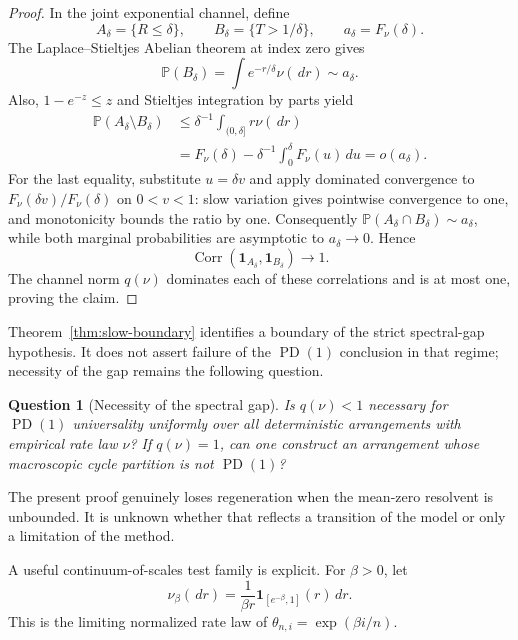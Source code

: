 \documentclass[11pt]{article}
\newtheorem{question}[theorem]{Question}
\theoremstyle{definition}
\theoremstyle{remark}
\newcommand{\Pp}{\mathbb P}
\newcommand{\Corr}{\operatorname{Corr}}
\newcommand{\PD}{\operatorname{PD}}
\newcommand{\one}{\mathbf 1}
\newcommand{\dd}{\,d}
\begin{document}
\begin{proof}
In the joint exponential channel, define
\[
 A_\delta=\{R\le\delta\},\qquad
 B_\delta=\{T>1/\delta\},\qquad
 a_\delta=F_\nu(\delta).
\]
The Laplace--Stieltjes Abelian theorem at index zero
\cite[Chapter~1]{BGT1987} gives
\[
 \Pp(B_\delta)=\int e^{-r/\delta}\nu(\dd r)\sim a_\delta.
\]
Also, $1-e^{-z}\le z$ and Stieltjes integration by parts yield
\begin{align*}
 \Pp(A_\delta\setminus B_\delta)
 &\le\delta^{-1}\int_{(0,\delta]}r\nu(\dd r)\\
 &=F_\nu(\delta)-\delta^{-1}\int_0^\delta F_\nu(u)\dd u
 =o(a_\delta).
\end{align*}
For the last equality, substitute $u=\delta v$ and apply dominated
convergence to $F_\nu(\delta v)/F_\nu(\delta)$ on $0<v<1$: slow variation
gives pointwise convergence to one, and monotonicity bounds the ratio by one.
Consequently $\Pp(A_\delta\cap B_\delta)\sim a_\delta$, while both marginal
probabilities are asymptotic to $a_\delta\to0$.  Hence
\[
 \Corr(\one_{A_\delta},\one_{B_\delta})\longrightarrow1.
\]
The channel norm $q(\nu)$ dominates each of these correlations and is at most
one, proving the claim.
\end{proof}

Theorem~\ref{thm:slow-boundary} identifies a boundary of the strict spectral-gap
hypothesis.  It does not assert failure of the $\PD(1)$ conclusion in that
regime; necessity of the gap remains the following question.

\begin{question}[Necessity of the spectral gap]
\label{q:sharpness}
Is $q(\nu)<1$ necessary for $\PD(1)$ universality uniformly over all
deterministic arrangements with empirical rate law $\nu$?  If $q(\nu)=1$,
can one construct an arrangement whose macroscopic cycle partition is not
$\PD(1)$?
\end{question}

The present proof genuinely loses regeneration when the mean-zero resolvent is
unbounded.  It is unknown whether that reflects a transition of the model or
only a limitation of the method.

A useful continuum-of-scales test family is explicit.  For $\beta>0$, let
\begin{equation}
 \nu_\beta(\dd r)=\frac{1}{\beta r}
 \one_{[e^{-\beta},1]}(r)\dd r.
 \label{eq:log-uniform-law}
\end{equation}
This is the limiting normalized rate law of
$\theta_{n,i}=\exp(\beta i/n)$.
\end{document}
